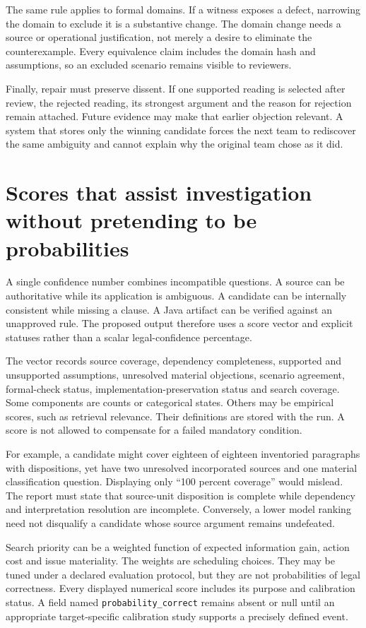 The same rule applies to formal domains. If a witness exposes a defect, narrowing
the domain to exclude it is a substantive change. The domain change needs a
source or operational justification, not merely a desire to eliminate the
counterexample. Every equivalence claim includes the domain hash and assumptions,
so an excluded scenario remains visible to reviewers.

Finally, repair must preserve dissent. If one supported reading is selected after
review, the rejected reading, its strongest argument and the reason for rejection
remain attached. Future evidence may make that earlier objection relevant. A
system that stores only the winning candidate forces the next team to rediscover
the same ambiguity and cannot explain why the original team chose as it did.

\section{Scores that assist investigation without pretending to be probabilities}

A single confidence number combines incompatible questions. A source can be
authoritative while its application is ambiguous. A candidate can be internally
consistent while missing a clause. A Java artifact can be verified against an
unapproved rule. The proposed output therefore uses a score vector and explicit
statuses rather than a scalar legal-confidence percentage.

The vector records source coverage, dependency completeness, supported and
unsupported assumptions, unresolved material objections, scenario agreement,
formal-check status, implementation-preservation status and search coverage.
Some components are counts or categorical states. Others may be empirical
scores, such as retrieval relevance. Their definitions are stored with the run.
A score is not allowed to compensate for a failed mandatory condition.

For example, a candidate might cover eighteen of eighteen inventoried paragraphs
with dispositions, yet have two unresolved incorporated sources and one material
classification question. Displaying only ``100 percent coverage'' would mislead.
The report must state that source-unit disposition is complete while dependency
and interpretation resolution are incomplete. Conversely, a lower model ranking
need not disqualify a candidate whose source argument remains undefeated.

Search priority can be a weighted function of expected information gain, action
cost and issue materiality. The weights are scheduling choices. They may be tuned
under a declared evaluation protocol, but they are not probabilities of legal
correctness. Every displayed numerical score includes its purpose and calibration
status. A field named \texttt{probability\_correct} remains absent or null until an
appropriate target-specific calibration study supports a precisely defined event.

